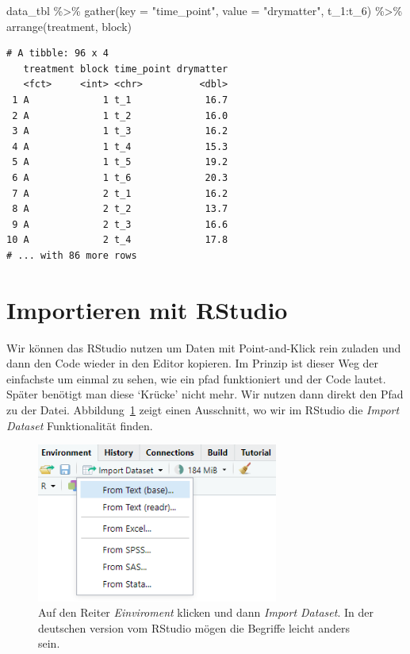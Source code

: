 \documentclass[
  letterpaper,
  DIV=11,
  oneside]{scrreport}
\newenvironment{Shaded}{\begin{snugshade}}{\end{snugshade}}
\newcommand{\AttributeTok}[1]{\textcolor[rgb]{0.40,0.45,0.13}{#1}}
\newcommand{\FunctionTok}[1]{\textcolor[rgb]{0.28,0.35,0.67}{#1}}
\newcommand{\NormalTok}[1]{\textcolor[rgb]{0.00,0.23,0.31}{#1}}
\newcommand{\SpecialCharTok}[1]{\textcolor[rgb]{0.37,0.37,0.37}{#1}}
\newcommand{\StringTok}[1]{\textcolor[rgb]{0.13,0.47,0.30}{#1}}
\begin{document}
\begin{Shaded}
\begin{Highlighting}[]
\NormalTok{data\_tbl }\SpecialCharTok{\%\textgreater{}\%} 
  \FunctionTok{gather}\NormalTok{(}\AttributeTok{key =} \StringTok{"time\_point"}\NormalTok{, }\AttributeTok{value =} \StringTok{"drymatter"}\NormalTok{, t\_1}\SpecialCharTok{:}\NormalTok{t\_6) }\SpecialCharTok{\%\textgreater{}\%} 
  \FunctionTok{arrange}\NormalTok{(treatment, block)}
\end{Highlighting}
\end{Shaded}

\begin{verbatim}
# A tibble: 96 x 4
   treatment block time_point drymatter
   <fct>     <int> <chr>          <dbl>
 1 A             1 t_1             16.7
 2 A             1 t_2             16.0
 3 A             1 t_3             16.2
 4 A             1 t_4             15.3
 5 A             1 t_5             19.2
 6 A             1 t_6             20.3
 7 A             2 t_1             16.2
 8 A             2 t_2             13.7
 9 A             2 t_3             16.6
10 A             2 t_4             17.8
# ... with 86 more rows
\end{verbatim}

\hypertarget{importieren-mit-rstudio}{%
\section{Importieren mit RStudio}\label{importieren-mit-rstudio}}

Wir können das RStudio nutzen um Daten mit Point-and-Klick rein zuladen
und dann den Code wieder in den Editor kopieren. Im Prinzip ist dieser
Weg der einfachste um einmal zu sehen, wie ein pfad funktioniert und der
Code lautet. Später benötigt man diese `Krücke' nicht mehr. Wir nutzen
dann direkt den Pfad zu der Datei. Abbildung~\ref{fig-imp-01} zeigt
einen Ausschnitt, wo wir im RStudio die \emph{Import Dataset}
Funktionalität finden.

\begin{figure}

{\centering \includegraphics[width=3.125in,height=\textheight]{./images/import_01.PNG}

}

\caption{\label{fig-imp-01}Auf den Reiter \emph{Einviroment} klicken und
dann \emph{Import Dataset}. In der deutschen version vom RStudio mögen
die Begriffe leicht anders sein.}

\end{figure}
\end{document}
